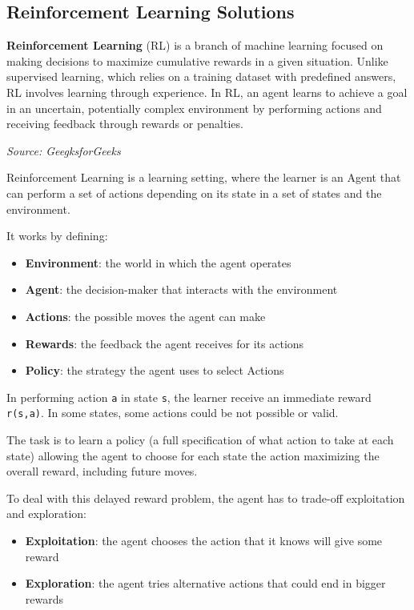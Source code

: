 \subsection{Reinforcement Learning Solutions}
\begin{blockquote}
  \textbf{Reinforcement Learning} (RL) is a branch of machine learning focused
  on making decisions to maximize cumulative rewards in a given situation. Unlike
  supervised learning, which relies on a training dataset with predefined
  answers, RL involves learning through experience. In RL, an agent learns to achieve
  a goal in an uncertain, potentially complex environment by performing actions
  and receiving feedback through rewards or penalties.

  \emph{Source: GeegksforGeeks \footnotemark}
\end{blockquote}

Reinforcement Learning is a learning setting, where the learner is an Agent that
can perform a set of actions depending on its state in a set of states and the
environment.

It works by defining:
\begin{itemize}
  \item \textbf{Environment}: the world in which the agent operates

  \item \textbf{Agent}: the decision-maker that interacts with the environment

  \item \textbf{Actions}: the possible moves the agent can make

  \item \textbf{Rewards}: the feedback the agent receives for its actions

  \item \textbf{Policy}: the strategy the agent uses to select Actions
\end{itemize}

In performing action \texttt{a} in state \texttt{s}, the learner receive an immediate
reward \texttt{r(s,a)}. In some states, some actions could be not possible or
valid.

The task is to learn a policy (a full specification of what action to take at each
state) allowing the agent to choose for each state the action maximizing the
overall reward, including future moves.

To deal with this delayed reward problem, the agent has to trade-off
exploitation and exploration:
\begin{itemize}
  \item \textbf{Exploitation}: the agent chooses the action that it knows will give
    some reward

  \item \textbf{Exploration}: the agent tries alternative actions that could end
    in bigger rewards
\end{itemize}

